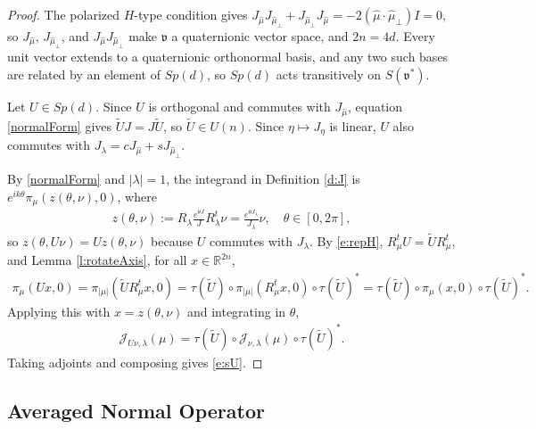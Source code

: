 \documentclass[11pt]{amsart}
\theoremstyle{plain}
\theoremstyle{definition}
\theoremstyle{remark}
\numberwithin{equation}{section}
\def\fv{\mathfrak{v}}
\def\cJ{\mathcal{J}}
\def\R{{\mathbb R}}%
\numberwithin{equation}{section}
\begin{document}
\begin{proof}
	The polarized $H$-type condition gives $J_{\hat\mu}J_{{\hat\mu}_\perp}+J_{{\hat\mu}_\perp}J_{\hat\mu}=-2(\hat\mu\cdot{\hat\mu}_\perp)I=0$, so $J_{\hat\mu}$, $J_{{\hat\mu}_\perp}$, and $J_{\hat\mu}J_{{\hat\mu}_\perp}$ make $\fv$ a quaternionic vector space, and $2n=4d$. Every unit vector extends to a quaternionic orthonormal basis, and any two such bases are related by an element of $Sp(d)$, so $Sp(d)$ acts transitively on $S(\fv^*)$.

	Let $U\in Sp(d)$. Since $U$ is orthogonal and commutes with $J_{\hat\mu}$, equation \eqref{normalForm} gives $\widetilde UJ=J\widetilde U$, so $\widetilde U\in U(n)$. Since $\eta\mapsto J_\eta$ is linear, $U$ also commutes with $J_{\lambda}=cJ_{\hat\mu}+sJ_{{\hat\mu}_\perp}$.

	By \eqref{normalForm} and $|\lambda|=1$, the integrand in Definition \ref{d:J} is $e^{ik\theta}\pi_\mu(z(\theta, \nu), 0)$, where
	\begin{align*}
		z(\theta, \nu):=R_\lambda\frac{e^{\theta J}}{J}R_\lambda^{t}\nu=\frac{e^{\theta J_\lambda}}{J_\lambda}\nu, \quad \theta\in[0, 2\pi],
	\end{align*}
	so $z(\theta, U\nu)=Uz(\theta, \nu)$ because $U$ commutes with $J_\lambda$. By \eqref{e:repH}, $R_\mu^tU=\widetilde UR_\mu^t$, and Lemma \ref{l:rotateAxis}, for all $x\in \R^{2n}$,
	\begin{align*}
		\pi_\mu(Ux, 0)=\pi_{|\mu|}(\widetilde UR_\mu^tx, 0)=\tau(\widetilde U)\circ\pi_{|\mu|}(R_\mu^tx, 0)\circ\tau(\widetilde U)^*=\tau(\widetilde U)\circ\pi_\mu(x, 0)\circ\tau(\widetilde U)^*.
	\end{align*}
	Applying this with $x=z(\theta, \nu)$ and integrating in $\theta$,
	\begin{align*}
		\cJ_{U\nu, \lambda}(\mu)=\tau(\widetilde U)\circ\cJ_{\nu, \lambda}(\mu)\circ\tau(\widetilde U)^*.
	\end{align*}
	Taking adjoints and composing gives \eqref{e:sU}.
\end{proof}


\subsection{Averaged Normal Operator}
\end{document}
